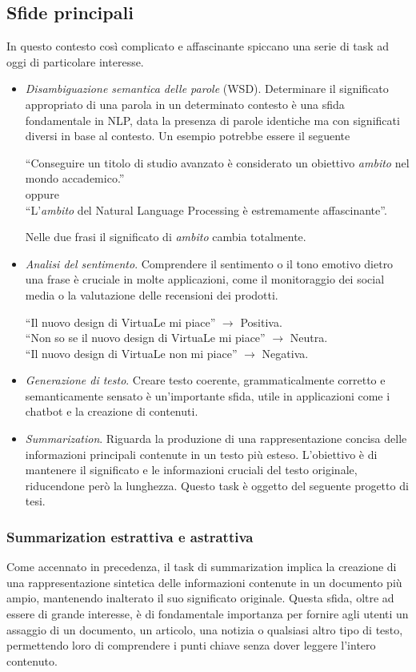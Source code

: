 \documentclass[12pt,a4paper,twoside,openright]{book}
\begin{document}
\subsection{Sfide principali}
In questo contesto così complicato e affascinante spiccano una serie di task ad oggi di particolare interesse. 
\begin{itemize}
    \item \emph{Disambiguazione semantica delle parole} (WSD). Determinare il significato appropriato di una parola in un determinato contesto è una sfida fondamentale in NLP, data la presenza di parole identiche ma con significati diversi in base al contesto.
    Un esempio potrebbe essere il seguente
    \begin{center}
        ``Conseguire un titolo di studio avanzato è considerato un obiettivo \emph{ambito} nel mondo accademico.'' \\
        oppure \\
        ``L'\emph{ambito} del Natural Language Processing è estremamente affascinante''.
    \end{center}
    Nelle due frasi il significato di \emph{ambito} cambia totalmente.
    \item \emph{Analisi del sentimento}. Comprendere il sentimento o il tono emotivo dietro una frase è cruciale in molte applicazioni, come il monitoraggio dei social media o la valutazione delle recensioni dei prodotti. 
    \begin{center}
        ``Il nuovo design di VirtuaLe mi piace'' $\rightarrow$ Positiva. \\
        ``Non so se il nuovo design di VirtuaLe mi piace'' $\rightarrow$ Neutra. \\
        ``Il nuovo design di VirtuaLe non mi piace'' $\rightarrow$ Negativa. 
    \end{center}
    \item \emph{Generazione di testo}. Creare testo coerente, grammaticalmente corretto e semanticamente sensato è un'importante sfida, utile in applicazioni come i chatbot e la creazione di contenuti.
    \item \emph{Summarization}. Riguarda la produzione di una rappresentazione concisa delle informazioni principali contenute in un testo più esteso. L'obiettivo è di mantenere il significato e le informazioni cruciali del testo originale, riducendone però la lunghezza. Questo task è oggetto del seguente progetto di tesi.
\end{itemize}

\subsubsection{Summarization estrattiva e astrattiva}
Come accennato in precedenza, il task di summarization implica la creazione di una rappresentazione sintetica delle informazioni contenute in un documento più ampio, mantenendo inalterato il suo significato originale. Questa sfida, oltre ad essere di grande interesse, è di fondamentale importanza per fornire agli utenti un assaggio di un documento, un articolo, una notizia o qualsiasi altro tipo di testo, permettendo loro di comprendere i punti chiave senza dover leggere l'intero contenuto.
\end{document}
